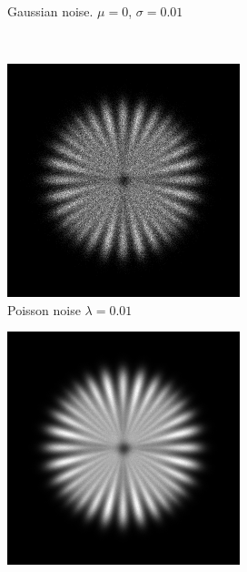 \documentclass{./packages/optica-article}
\begin{document}
\begin{figure}[hbp]
\begin{center}
\begin{subfigure}[t]{0.25\textwidth}
			\caption{Gaussian noise. $\mu=0$, $\sigma=0.01$}\label{fig:sim:ng0.01}
		\end{subfigure}
		\\
		\begin{subfigure}[t]{0.25\textwidth}\centering
			\centering
			\includegraphics[width=\textwidth]{Simulation deconvolution/ref_np_0.01}
			\caption{Poisson noise $\lambda = 0.01$}\label{fig:sim:np0.01}
		\end{subfigure}
		\quad
		\begin{subfigure}[t]{0.25\textwidth}\centering
			\centering
			\includegraphics[width=\textwidth]{Simulation deconvolution/ref_np_0.0001}

\end{subfigure}
\end{center}
\end{figure}
\end{document}
